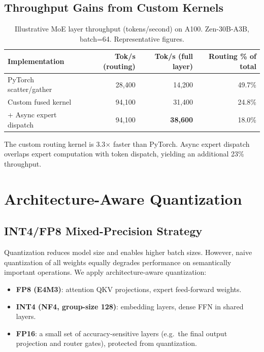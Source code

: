 \documentclass[11pt,a4paper]{article}
\begin{document}
\subsection{Throughput Gains from Custom Kernels}

\begin{table}[H]
\centering
\caption{Illustrative MoE layer throughput (tokens/second) on A100. Zen-30B-A3B, batch=64. Representative figures.}
\begin{tabular}{lrrr}
\toprule
\textbf{Implementation} & \textbf{Tok/s (routing)} & \textbf{Tok/s (full layer)} & \textbf{Routing \% of total} \\
\midrule
PyTorch scatter/gather  & 28,400 & 14,200 & 49.7\% \\
Custom fused kernel     & 94,100 & 31,400 & 24.8\% \\
+ Async expert dispatch & 94,100 & \textbf{38,600} & 18.0\% \\
\bottomrule
\end{tabular}
\label{tab:moe_kernels}
\end{table}

The custom routing kernel is 3.3$\times$ faster than PyTorch. Async expert dispatch
overlaps expert computation with token dispatch, yielding an additional 23\% throughput.

\section{Architecture-Aware Quantization}
\label{sec:quantization}

\subsection{INT4/FP8 Mixed-Precision Strategy}

Quantization reduces model size and enables higher batch sizes. However, naive
quantization of all weights equally degrades performance on semantically important
operations. We apply architecture-aware quantization:

\begin{itemize}
    \item \textbf{FP8 (E4M3)}: attention QKV projections, expert feed-forward weights.
    \item \textbf{INT4 (NF4, group-size 128)}: embedding layers, dense FFN in shared layers.
    \item \textbf{FP16}: a small set of accuracy-sensitive layers (e.g.\ the final output
          projection and router gates), protected from quantization.
\end{itemize}
\end{document}
